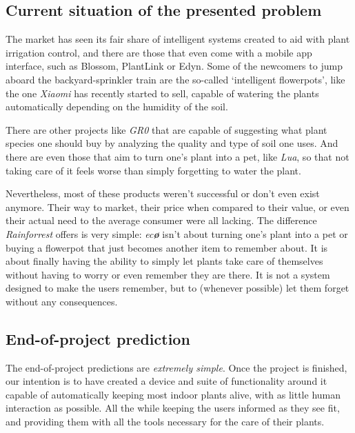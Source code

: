 \documentclass[english,runningheads,a4paper]{llncs}[2018/03/10]
\begin{document}
    \subsection*{Current situation of the presented problem}

    The market has seen its fair share of intelligent systems created to aid
    with plant irrigation control, and there are those that even come with a
    mobile app interface, such as Blossom, PlantLink or Edyn. Some of the
    newcomers to jump aboard the backyard-sprinkler train are the so-called
    `intelligent flowerpots', like the one \textit{Xiaomi} has recently started
    to sell, capable of watering the plants automatically depending on the
    humidity of the soil.

    There are other projects like \textit{GR0} that are capable of suggesting
    what plant species one should buy by analyzing the quality and type of soil
    one uses. And there are even those that aim to turn one's plant into a pet,
    like \textit{Lua}, so that not taking care of it feels worse than simply
    forgetting to water the plant.

    Nevertheless, most of these products weren't successful or don't even exist
    anymore. Their way to market, their price when compared to their value, or
    even their actual need to the average consumer were all lacking. The
    difference \textit{Rainforrest} offers is very simple:
    \textit{ec\textbf{\o}} isn't about turning one's plant into a pet or buying
    a flowerpot that just becomes another item to remember about. It is about
    finally having the ability to simply let plants take care of themselves
    without having to worry or even remember they are there. It is not a system
    designed to make the users remember, but to (whenever possible) let them
    forget without any consequences.


    \subsection*{End-of-project prediction}

    The end-of-project predictions are \textit{extremely simple}. Once the
    project is finished, our intention is to have created a device and suite of
    functionality around it capable of automatically keeping most indoor plants
    alive, with as little human interaction as possible. All the while keeping
    the users informed as they see fit, and providing them with all the tools
    necessary for the care of their plants.
\end{document}

